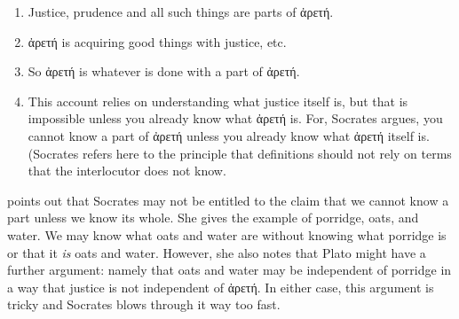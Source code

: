 \documentclass[11pt]{article}
\begin{document}
\begin{enumerate}
    \item Justice, prudence and all such things are parts of {\g ἀρετή}.
    \item {\g ἀρετή} is acquiring good things with justice, etc.
    \item So {\g ἀρετή} is whatever is done with a part of {\g ἀρετή}.
    \item This account relies on understanding what justice itself is, but that is impossible unless you already know what {\g ἀρετή} is. For, Socrates argues, you cannot know a part of {\g ἀρετή} unless you already know what {\g ἀρετή} itself is. (Socrates refers here to the principle that definitions should not rely on terms that the interlocutor does not know.
\end{enumerate}

\citet[59]{fine2014} points out that Socrates may not be entitled to the claim that we cannot know a part unless we know its whole. She gives the example of porridge, oats, and water. We may know what oats and water are without knowing what porridge is or that it \emph{is} oats and water. However, she also notes that Plato might have a further argument: namely that oats and water may be independent of porridge in a way that justice is not independent of {\g ἀρετή}. In either case, this argument is tricky and Socrates blows through it way too fast.  


\newpage


\end{document}
